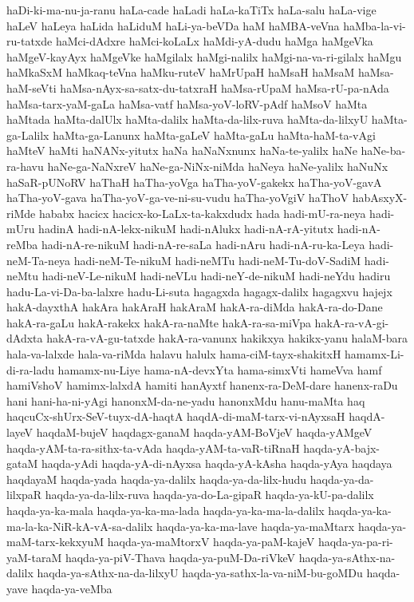 {haDi-ki-ma-nu-ja-ranu
haLa-cade
haLadi
haLa-kaTiTx
haLa-salu
haLa-vige
haLeV
haLeya
haLida
haLiduM
haLi-ya-beVDa
haM
haMBA-veVna
haMba-la-vi-ru-tatxde
haMci-dAdxre
haMci-koLaLx
haMdi-yA-dudu
haMga
haMgeVka
haMgeV-kayAyx
haMgeVke
haMgilalx
haMgi-nalilx
haMgi-na-va-ri-gilalx
haMgu
haMkaSxM
haMkaq-teVna
haMku-ruteV
haMrUpaH
haMsaH
haMsaM
haMsa-haM-seVti
haMsa-nAyx-sa-satx-du-tatxraH
haMsa-rUpaM
haMsa-rU-pa-nAda
haMsa-tarx-yaM-gaLa
haMsa-vatf
haMsa-yoV-loRV-pAdf
haMsoV
haMta
haMtada
haMta-dalUlx
haMta-dalilx
haMta-da-lilx-ruva
haMta-da-lilxyU
haMta-ga-Lalilx
haMta-ga-Lanunx
haMta-gaLeV
haMta-gaLu
haMta-haM-ta-vAgi
haMteV
haMti
haNANx-yitutx
haNa
haNaNxnunx
haNa-te-yalilx
haNe
haNe-ba-ra-havu
haNe-ga-NaNxreV
haNe-ga-NiNx-niMda
haNeya
haNe-yalilx
haNuNx
haSaR-pUNoRV
haThaH
haTha-yoVga
haTha-yoV-gakekx
haTha-yoV-gavA
haTha-yoV-gava
haTha-yoV-ga-ve-ni-su-vudu
haTha-yoVgiV
haThoV
habAsxyX-riMde
hababx
hacicx
hacicx-ko-LaLx-ta-kakxdudx
hada
hadi-mU-ra-neya
hadi-mUru
hadinA
hadi-nA-lekx-nikuM
hadi-nAlukx
hadi-nA-rA-yitutx
hadi-nA-reMba
hadi-nA-re-nikuM
hadi-nA-re-saLa
hadi-nAru
hadi-nA-ru-ka-Leya
hadi-neM-Ta-neya
hadi-neM-Te-nikuM
hadi-neMTu
hadi-neM-Tu-doV-SadiM
hadi-neMtu
hadi-neV-Le-nikuM
hadi-neVLu
hadi-neY-de-nikuM
hadi-neYdu
hadiru
hadu-La-vi-Da-ba-lalxre
hadu-Li-suta
hagagxda
hagagx-dalilx
hagagxvu
hajejx
hakA-dayxthA
hakAra
hakAraH
hakAraM
hakA-ra-diMda
hakA-ra-do-Dane
hakA-ra-gaLu
hakA-rakekx
hakA-ra-naMte
hakA-ra-sa-miVpa
hakA-ra-vA-gi-dAdxta
hakA-ra-vA-gu-tatxde
hakA-ra-vanunx
hakikxya
hakikx-yanu
halaM-bara
hala-va-lalxde
hala-va-riMda
halavu
halulx
hama-ciM-tayx-shakitxH
hamamx-Li-di-ra-ladu
hamamx-nu-Liye
hama-nA-devxYta
hama-simxVti
hameVva
hamf
hamiVshoV
hamimx-lalxdA
hamiti
hanAyxtf
hanenx-ra-DeM-dare
hanenx-raDu
hani
hani-ha-ni-yAgi
hanonxM-da-ne-yadu
hanonxMdu
hanu-maMta
haq
haqcuCx-shUrx-SeV-tuyx-dA-haqtA
haqdA-di-maM-tarx-vi-nAyxsaH
haqdA-layeV
haqdaM-bujeV
haqdagx-ganaM
haqda-yAM-BoVjeV
haqda-yAMgeV
haqda-yAM-ta-ra-sithx-ta-vAda
haqda-yAM-ta-vaR-tiRnaH
haqda-yA-bajx-gataM
haqda-yAdi
haqda-yA-di-nAyxsa
haqda-yA-kAsha
haqda-yAya
haqdaya
haqdayaM
haqda-yada
haqda-ya-dalilx
haqda-ya-da-lilx-hudu
haqda-ya-da-lilxpaR
haqda-ya-da-lilx-ruva
haqda-ya-do-La-gipaR
haqda-ya-kU-pa-dalilx
haqda-ya-ka-mala
haqda-ya-ka-ma-lada
haqda-ya-ka-ma-la-dalilx
haqda-ya-ka-ma-la-ka-NiR-kA-vA-sa-dalilx
haqda-ya-ka-ma-lave
haqda-ya-maMtarx
haqda-ya-maM-tarx-kekxyuM
haqda-ya-maMtorxV
haqda-ya-paM-kajeV
haqda-ya-pa-ri-yaM-taraM
haqda-ya-piV-Thava
haqda-ya-puM-Da-riVkeV
haqda-ya-sAthx-na-dalilx
haqda-ya-sAthx-na-da-lilxyU
haqda-ya-sathx-la-va-niM-bu-goMDu
haqda-yave
haqda-ya-veMba
}
